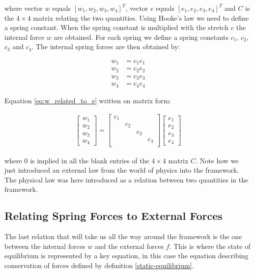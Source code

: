where vector $w$ equals $[w_1, w_2, w_3, w_4]^T$, vector $e$ equals
$[e_1, e_2, e_3, e_4]^T$ and $C$ is the $4 \times 4$ matrix relating the two
quantities. Using Hooke's law we need to define a spring constant. When
the spring constant is multiplied with the stretch $e$ the internal
force $w$ are obtained. For each spring we define
a spring constants $c_1$, $c_2$, $c_3$ and $c_4$. The internal
spring forces are then obtained by:

\begin{align*}
w_1 &= c_1 e_1 \\
w_2 &= c_2 e_2 \\
w_3 &= c_3 e_3 \\
w_4 &= c_4 e_4
\end{align*}

Equation \eqref{eq:w_related_to_e} written on matrix form:

\begin{align}
\begin{bmatrix}
w_1 \\ w_2\\ w_3 \\ w_4
\end{bmatrix}
=
\begin{bmatrix}
c_1 &  &  &  \\
 & c_2 &  &  \\
 &  & c_3 &  \\
 &  &  & c_4 \\
\end{bmatrix}
\begin{bmatrix}
e_1 \\ e_2 \\ e_3 \\ e_4
\end{bmatrix}
\end{align}

where $0$ is implied in all the blank entries of the $4 \times 4$
matrix $C$. Note how we
just introduced an external law from the world of physics into the
framework. The physical law was here introduced as a relation between
two quantities in the framework. \\

\subsection{Relating Spring Forces to External Forces}
The last relation that will take us all the way around the framework
is the one between the internal 
forces $w$ and the external forces $f$. This is where the state of
equilibrium is represented by a key equation, in this case the equation
describing conservation of forces defined by definition
\vref{static-equilibrium}.\\

